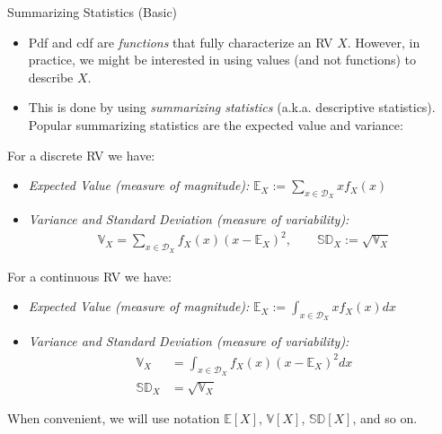 \documentclass[handout,9pt]{beamer}
\begin{document}
%
\begin{frame}{Summarizing Statistics (Basic)}

\begin{itemize}
 \setlength{\itemsep}{5pt}
\item Pdf and cdf are {\em functions} that fully characterize an RV $X$. However, in practice, we might be interested in using values (and not functions) to describe $X$.  
\item This is done by using {\em summarizing statistics} (a.k.a. descriptive statistics).  Popular summarizing statistics are the expected value and variance:
\end{itemize}
\begin{block}{}
For a discrete RV we have:
\begin{itemize}
\item {\em Expected Value (measure of magnitude):} $\mathbb{E}_X:=\sum_{x\in {\mathcal{D}}_X}x{f}_X(x)$

\item {\em Variance and Standard Deviation (measure of variability):} 
\begin{align*}
\mathbb{V}_X=\sum_{x\in {\mathcal{D}}_X}f_X(x)(x-\mathbb{E}_X)^2,\qquad \mathbb{SD}_X:=\sqrt{\mathbb{V}_X}
\end{align*}
\end{itemize}
\end{block}

\begin{block}{}
For a continuous RV we have:
\begin{itemize}
\item {\em Expected Value (measure of magnitude):}  $\mathbb{E}_X:=\int_{x\in {\mathcal{D}}_X}x{f}_X(x)dx$
\item {\em Variance and Standard Deviation (measure of variability):} 
\begin{align*}
\mathbb{V}_X&=\int_{x\in {\mathcal{D}}_X}f_X(x)(x-\mathbb{E}_X)^2dx\\
 \mathbb{SD}_X&=\sqrt{\mathbb{V}_X}
\end{align*}
\end{itemize}
\end{block}
When convenient, we will use notation $\mathbb{E}[X]$, $\mathbb{V}[X]$, $\mathbb{SD}[X]$, and so on. 
\end{frame}
\end{document}
